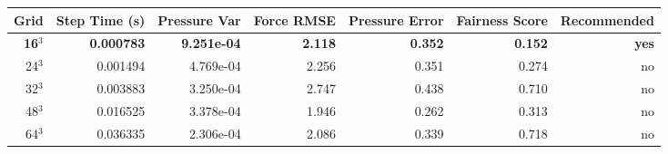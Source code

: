 \begin{tabular}{rrrrrrr}
\toprule
Grid & Step Time (s) & Pressure Var & Force RMSE & Pressure Error & Fairness Score & Recommended \\
\midrule
\textbf{16$^3$} & \textbf{0.000783} & \textbf{9.251e-04} & \textbf{2.118} & \textbf{0.352} & \textbf{0.152} & \textbf{yes} \\
24$^3$ & 0.001494 & 4.769e-04 & 2.256 & 0.351 & 0.274 & no \\
32$^3$ & 0.003883 & 3.250e-04 & 2.747 & 0.438 & 0.710 & no \\
48$^3$ & 0.016525 & 3.378e-04 & 1.946 & 0.262 & 0.313 & no \\
64$^3$ & 0.036335 & 2.306e-04 & 2.086 & 0.339 & 0.718 & no \\
\bottomrule
\end{tabular}
